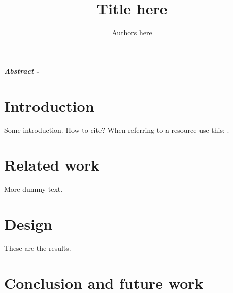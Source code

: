 \documentclass[a4paper]{paper}
\title{Title here}
\author{Authors here}
\begin{document}
 
\twocolumn[
\maketitle
]

\textbf{
\textit{Abstract} - \lipsum[1]
}

\section{Introduction} 

Some introduction. How to cite? When referring to a resource use this: \cite{yaggi2006sleep}. \lipsum[2]

\section{Related work} 

More dummy text. \lipsum[4] 

\section{Design} 

These are the results. \lipsum[5]

\section{Conclusion and future work} 

\lipsum[6]

\printbibliography %
\end{document}
